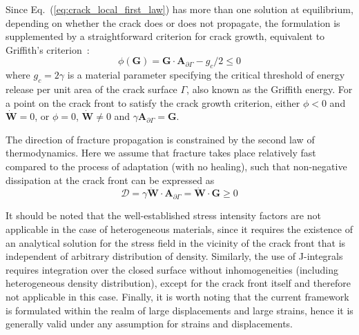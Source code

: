 \documentclass[review]{elsarticle}
\numberwithin{equation}{section}
\begin{document}
Since Eq.~(\ref{eq:crack_local_first_law}) has more than one solution at equilibrium, depending on whether the crack 
does or does not propagate, the formulation is supplemented by a straightforward criterion for crack growth, equivalent to Griffith's  criterion~\citep{kaczmarczyk2017energy}:
\begin{equation} \label{eq:grif1}
\phi(\mathbf{G}) = 
\mathbf{G} \cdot \mathbf{A}_{\partial\Gamma} - g_c/2 \leq 0
\end{equation} 
where $g_c=2\gamma$ is a material parameter specifying the critical threshold of energy release
per unit area of the crack surface $\Gamma$, also known as the Griffith energy. For a point on the crack front to satisfy the crack growth criterion, 
either $\phi<0$ and $\dot{\mathbf{W}}=0$, or $\phi=0$, $\dot{\mathbf{W}}\ne 0$ and $\gamma\mathbf{A}_{\partial\Gamma}=\mathbf{G}$. 


The direction of fracture propagation is
constrained by the second law of thermodynamics. Here we assume that fracture takes place
relatively fast compared to the process of adaptation (with no healing), 
such that non-negative dissipation at the crack front can be expressed as
\begin{equation}
	\mathcal{D} = \gamma \dot{\mathbf{W}} \cdot \mathbf{A}_{\partial\Gamma}= \dot{\mathbf{W}} \cdot \mathbf{G}\ge0
\end{equation}

It should be noted that the well-established stress intensity factors are not applicable 
in the case of heterogeneous materials, since it requires the existence of
an analytical solution for the stress field in the vicinity of the crack front that is
independent of arbitrary distribution of density. 
Similarly, the use of
J-integrals requires integration over the closed surface without
inhomogeneities (including heterogeneous density distribution), except for the crack front itself and therefore not applicable in this case.
Finally, it is worth noting that the current framework is formulated within 
the realm of large displacements and large strains, hence it 
is generally valid under any assumption for strains and displacements.
\end{document}
